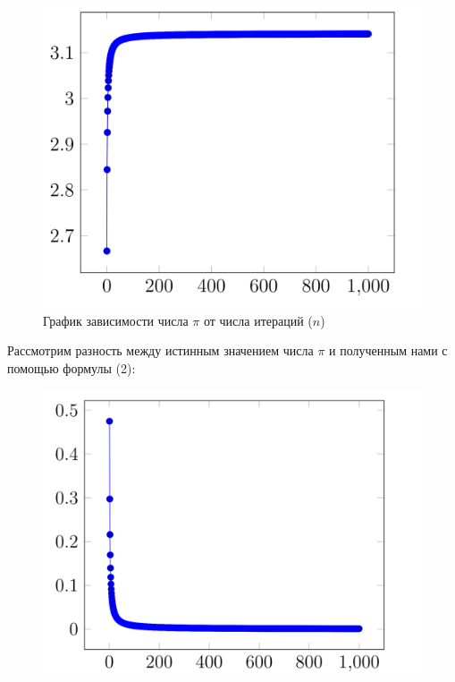 \documentclass[a4paper, 12pt]{article}
\begin{document}
\begin{enumerate}
\begin{enumerate}
                            \begin{figure}[h!]
        			        \centering
        			            \includegraphics[scale = 0.25]{2-1.png}
        			            \caption{График зависимости числа $\pi$ от числа итераций ($n$)}
        			            \label{fig:my_label}
        		          \end{figure}
                            \newpage
                            Рассмотрим разность между истинным значением числа $\pi$ и полученным нами с помощью формулы (2):
                            \begin{figure}[h!]
        			        \centering
        			            \includegraphics[scale = 0.25]{2-2.png}

\end{figure}
\end{enumerate}
\end{enumerate}
\end{document}
